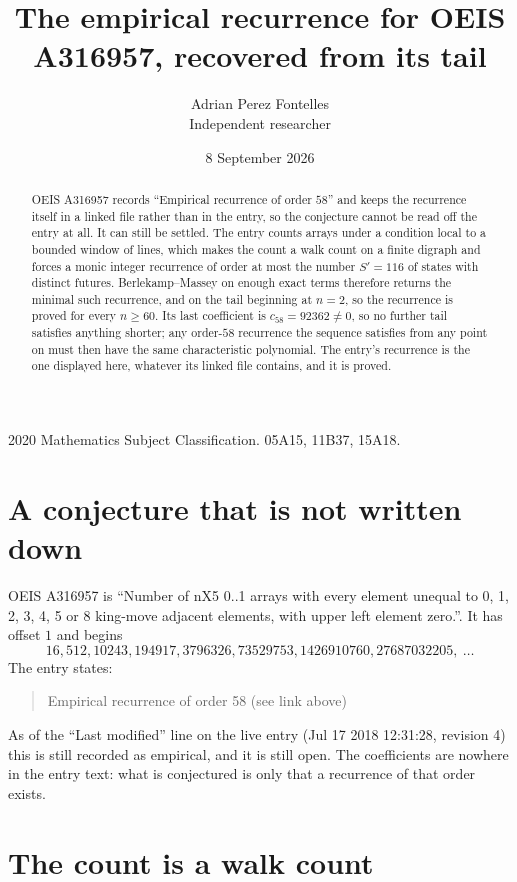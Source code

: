\documentclass[11pt,a4paper]{article}
\title{The empirical recurrence for OEIS A316957, recovered from its tail}
\author{Adrian Perez Fontelles\\ \small Independent researcher}
\date{8 September 2026}
\theoremstyle{plain}
\theoremstyle{definition}
\begin{document}
\maketitle

\begin{abstract}
OEIS A316957 records ``Empirical recurrence of order $58$'' and keeps the recurrence itself in
a linked file rather than in the entry, so the conjecture cannot be read off the entry at all.
It can still be settled. The entry counts arrays under a condition local to a bounded window of
lines, which makes the count a walk count on a finite digraph and forces a monic integer
recurrence of order at most the number $S'=116$ of states with distinct futures. Berlekamp--Massey on
enough exact terms therefore returns the minimal such recurrence, and on the tail beginning at $n=2$, so the recurrence is proved for every $n\ge60$.
Its last coefficient is $c_{58}=92362\neq0$, so no further tail satisfies anything
shorter; any order-$58$ recurrence the sequence satisfies from any point on must then have
the same characteristic polynomial. The entry's recurrence is the one displayed here, whatever
its linked file contains, and it is proved.
\end{abstract}

\noindent\small 2020 Mathematics Subject Classification. 05A15, 11B37, 15A18.\normalsize

\section{A conjecture that is not written down}

OEIS A316957 is ``Number of nX5 0..1 arrays with every element unequal to 0, 1, 2, 3, 4, 5 or 8 king-move adjacent elements, with upper left element zero.''. It has offset $1$ and begins
\[
16, 512, 10243, 194917, 3796326, 73529753, 1426910760, 27687032205,\ \dots
\]
The entry states:
\begin{quote}
Empirical recurrence of order 58 (see link above)
\end{quote}
As of the ``Last modified'' line on the live entry (Jul 17 2018 12:31:28, revision 4)
this is still recorded as empirical, and it is still open. The coefficients are nowhere in the
entry text: what is conjectured is only that a recurrence of that order exists.

\section{The count is a walk count}
\end{document}
